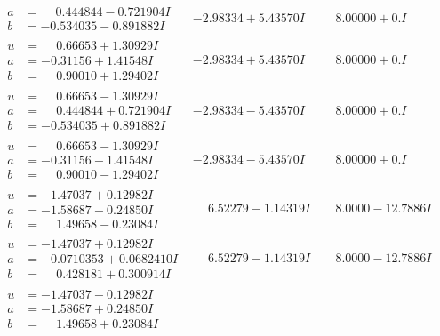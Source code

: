 \documentclass[1p]{elsarticle_modified}
\theoremstyle{definition}
\begin{document}
$$\begin{array}{c|c|c}
\begin{aligned}
a &= \phantom{-}0.444844 - 0.721904 I \\
b &= -0.534035 - 0.891882 I\end{aligned}
 & -2.98334 + 5.43570 I & \phantom{-}8.00000 + 0. I\phantom{ +0.000000I} \\ \hline\begin{aligned}
u &= \phantom{-}0.66653 + 1.30929 I \\
a &= -0.31156 + 1.41548 I \\
b &= \phantom{-}0.90010 + 1.29402 I\end{aligned}
 & -2.98334 + 5.43570 I & \phantom{-}8.00000 + 0. I\phantom{ +0.000000I} \\ \hline\begin{aligned}
u &= \phantom{-}0.66653 - 1.30929 I \\
a &= \phantom{-}0.444844 + 0.721904 I \\
b &= -0.534035 + 0.891882 I\end{aligned}
 & -2.98334 - 5.43570 I & \phantom{-}8.00000 + 0. I\phantom{ +0.000000I} \\ \hline\begin{aligned}
u &= \phantom{-}0.66653 - 1.30929 I \\
a &= -0.31156 - 1.41548 I \\
b &= \phantom{-}0.90010 - 1.29402 I\end{aligned}
 & -2.98334 - 5.43570 I & \phantom{-}8.00000 + 0. I\phantom{ +0.000000I} \\ \hline\begin{aligned}
u &= -1.47037 + 0.12982 I \\
a &= -1.58687 - 0.24850 I \\
b &= \phantom{-}1.49658 - 0.23084 I\end{aligned}
 & \phantom{-}6.52279 - 1.14319 I & \phantom{-}8.0000 - 12.7886 I \\ \hline\begin{aligned}
u &= -1.47037 + 0.12982 I \\
a &= -0.0710353 + 0.0682410 I \\
b &= \phantom{-}0.428181 + 0.300914 I\end{aligned}
 & \phantom{-}6.52279 - 1.14319 I & \phantom{-}8.0000 - 12.7886 I \\ \hline\begin{aligned}
u &= -1.47037 - 0.12982 I \\
a &= -1.58687 + 0.24850 I \\
b &= \phantom{-}1.49658 + 0.23084 I\end{aligned}

\end{array}$$
\end{document}
